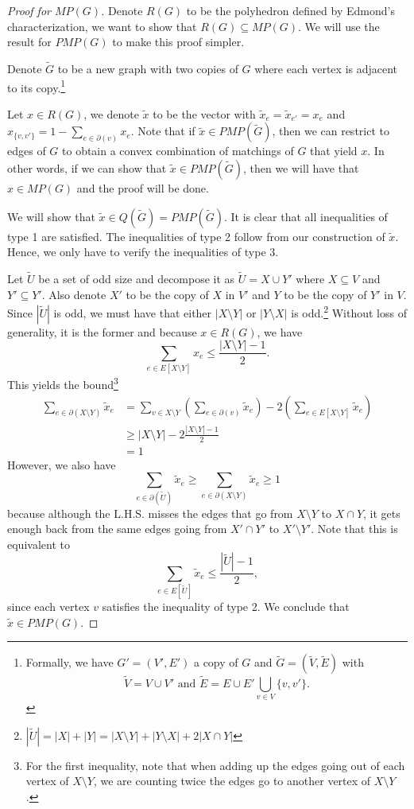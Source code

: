 \documentclass{tufte-handout}
\newcommand{\bra}[1]{\left(#1\right)}
\theoremstyle{definition}
\theoremstyle{remark}
\begin{document}
\begin{proof}[Proof for $MP(G)$]
	Denote $R(G)$ to be the polyhedron defined by Edmond's characterization, we want to show that $R(G) \subseteq MP(G)$. We will use the result for $PMP(G)$ to make this proof simpler.
	
	Denote $\tilde{G}$ to be a new graph with two copies of $G$ where each vertex is adjacent to its copy.\footnote{Formally, we have $G' = (V',E')$ a copy of $G$ and $\tilde{G} = (\tilde{V}, \tilde{E})$ with
	$$\tilde{V} = V \cup V' \text{ and }\tilde{E} = E \cup E' \bigcup_{v \in V} \{v,v'\}.$$}

	Let $x \in R(G)$, we denote $\tilde{x}$ to be the vector with $\tilde{x}_e = \tilde{x}_{e'} = x_e$ and $x_{\{v,v'\}} = 1- \sum_{e \in \partial(v)} x_e$. Note that if $\tilde{x} \in PMP(\tilde{G})$, then we can restrict to edges of $G$ to obtain a convex combination of matchings of $G$ that yield $x$. In other words, if we can show that $\tilde{x} \in PMP(\tilde{G})$, then we will have that $x \in MP(G)$ and the proof will be done.
	
	We will show that $\tilde{x} \in Q(\tilde{G}) = PMP(\tilde{G})$. It is clear that all inequalities of type 1 are satisfied. The inequalities of type 2 follow from our construction of $\tilde{x}$. Hence, we only have to verify the inequalities of type 3.
	
	Let $\tilde{U}$ be a set of odd size and decompose it as $\tilde{U} = X \cup Y'$ where $X \subseteq V$ and $Y' \subseteq Y'$. Also denote $X'$ to be the copy of $X$ in $V'$ and $Y$ to be the copy of $Y'$ in $V$. Since $|\tilde{U}|$ is odd, we must have that either $|X \setminus Y|$ or $|Y \setminus X|$ is odd.\footnote{ $|\tilde{U}| = |X|+|Y| = |X\setminus Y| + |Y\setminus X| + 2|X \cap Y|$} Without loss of generality, it is the former and because $x \in R(G)$, we have 
	$$\sum_{e \in E[X\setminus Y]} x_e \leq \frac{|X\setminus Y| -1}{2}.$$
	This yields the bound\footnote{For the first inequality, note that when adding up the edges going out of each vertex of $X\setminus Y$, we are counting twice the edges go to another vertex of $X\setminus Y$.}
	\begin{align*}
		\sum_{e \in \partial(X\setminus Y)} \tilde{x}_e &= \sum_{v \in X\setminus Y}\bra{\sum_{e \in \partial(v)}\tilde{x}_e} -2 \bra{\sum_{e \in E[X \setminus Y]} \tilde{x}_e}\\
		&\geq |X\setminus Y| -2 \frac{|X\setminus Y| -1}{2}\\
		&= 1
	\end{align*}
	However, we also have 
	$$\sum_{e \in \partial(\tilde{U})} \tilde{x}_e \geq \sum_{e \in \partial(X\setminus Y) }\tilde{x}_e \geq 1$$
	because although the L.H.S. misses the edges that go from $X\setminus Y$ to $X \cap Y$, it gets enough back from the same edges going from $X' \cap Y'$ to $X'\setminus Y'$. Note that this is equivalent to
	$$\sum_{e \in E[\tilde{U}]} \tilde{x}_e \leq \frac{|\tilde{U}|-1}{2},$$
	since each vertex $v$ satisfies the inequality of type 2. We conclude that $\tilde{x} \in PMP(G)$.
\end{proof}
\end{document}
